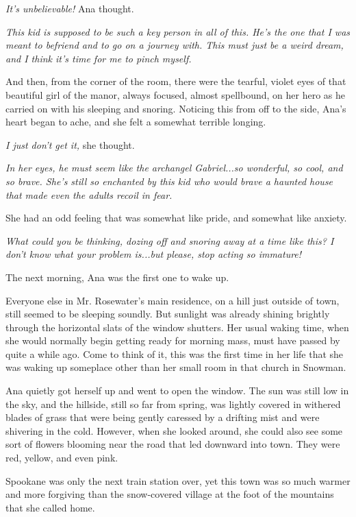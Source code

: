 \documentclass[
]{article}
\begin{document}
\emph{It's unbelievable! }Ana thought.

\emph{This kid is supposed to be such a key person in all of this. He's
the one that I was meant to befriend and to go on a journey with. This
must just be a weird dream, and I think it's time for me to pinch
myself.}

And then, from the corner of the room, there were the tearful, violet
eyes of that beautiful girl of the manor, always focused, almost
spellbound, on her hero as he carried on with his sleeping and snoring.
Noticing this from off to the side, Ana's heart began to ache, and she
felt a somewhat terrible longing.

\emph{I just don't get it,} she thought.

\emph{In her eyes, he must seem like the archangel Gabriel...so
wonderful, so cool, and so brave. She's still so enchanted by this kid
who would brave a haunted house that made even the adults recoil in
fear.}

She had an odd feeling that was somewhat like pride, and somewhat like
anxiety.

\emph{What could you be thinking, dozing off and snoring away at a time
like this? I don't know what your problem is...but please, stop acting
so immature!}

The next morning, Ana was the first one to wake up.

Everyone else in Mr. Rosewater's main residence, on a hill just outside
of town, still seemed to be sleeping soundly. But sunlight was already
shining brightly through the horizontal slats of the window shutters.
Her usual waking time, when she would normally begin getting ready for
morning mass, must have passed by quite a while ago. Come to think of
it, this was the first time in her life that she was waking up someplace
other than her small room in that church in Snowman.

Ana quietly got herself up and went to open the window. The sun was
still low in the sky, and the hillside, still so far from spring, was
lightly covered in withered blades of grass that were being gently
caressed by a drifting mist and were shivering in the cold. However,
when she looked around, she could also see some sort of flowers blooming
near the road that led downward into town. They were red, yellow, and
even pink.

Spookane was only the next train station over, yet this town was so much
warmer and more forgiving than the snow-covered village at the foot of
the mountains that she called home.
\end{document}
